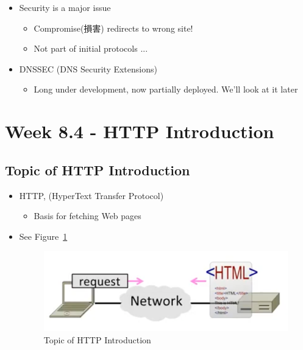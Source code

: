 \documentclass[12pt]{ctexart}   %
\begin{document}
\begin{itemize}
		 \item Security is a major issue
		 \begin{itemize}
		 	\item Compromise(損害) redirects to wrong site!
		 	\item Not part of initial protocols ...
		 \end{itemize}
		 
		 \item DNSSEC (DNS Security Extensions)
		 \begin{itemize}
		 	\item Long under development, now partially deployed. We'll look at it later
		 \end{itemize}
	\end{itemize}
	
\section{Week 8.4 - HTTP Introduction}
	\subsection{Topic of HTTP Introduction}
	\begin{itemize}
		\item HTTP, (HyperText Transfer Protocol)
		\begin{itemize}
			\item Basis for fetching Web pages
		\end{itemize}
		\item See Figure~\ref{fig:8-4-1}
		  
		 \begin{figure}[h!] %
		\centering
		 \includegraphics[scale=0.7]{images/8-4-1}
		\caption{ Topic of HTTP Introduction }
		 \label{fig:8-4-1}
		 \end{figure}
	\end{itemize}
	
\end{document}
